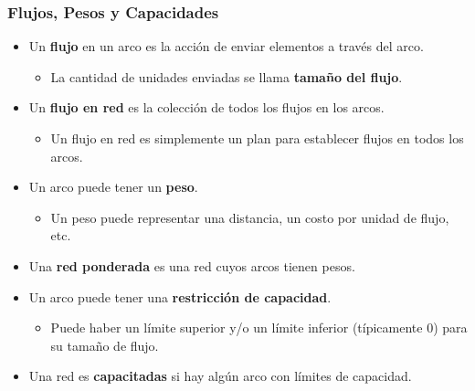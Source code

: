 \documentclass{beamer}
\begin{document}
\begin{frame}
    \frametitle{Flujos, Pesos y Capacidades}
    
    \begin{itemize}
        \item Un \textbf{flujo} en un arco es la acción de enviar elementos a través del arco.
        \begin{itemize}
            \item La cantidad de unidades enviadas se llama \textbf{tamaño del flujo}.
        \end{itemize}
        \item Un \textbf{flujo en red} es la colección de todos los flujos en los arcos.
        \begin{itemize}
            \item Un flujo en red es simplemente un plan para establecer flujos en todos los arcos.
        \end{itemize}
        \item Un arco puede tener un \textbf{peso}.
        \begin{itemize}
            \item Un peso puede representar una distancia, un costo por unidad de flujo, etc.
        \end{itemize}
        \item Una \textbf{red ponderada} es una red cuyos arcos tienen pesos.
        \item Un arco puede tener una \textbf{restricción de capacidad}.
        \begin{itemize}
            \item Puede haber un límite superior y/o un límite inferior (típicamente 0) para su tamaño de flujo.
        \end{itemize}
        \item Una red es \textbf{capacitadas} si hay algún arco con límites de capacidad.
    \end{itemize}

\end{frame}
\end{document}
